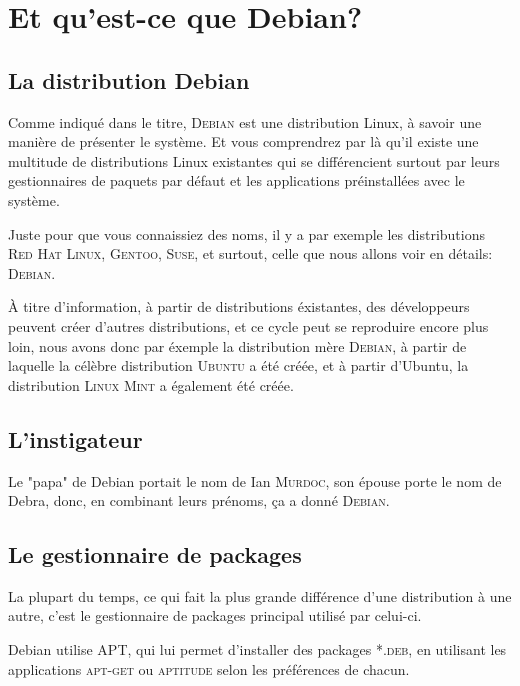 \chapter{Et qu'est-ce que Debian?}

\section{La distribution Debian}

Comme indiqué dans le titre, \textsc{Debian} est une distribution Linux, à savoir
une manière de présenter le système. Et vous comprendrez par là qu'il existe
une multitude de distributions Linux existantes qui se différencient surtout
par leurs gestionnaires de paquets par défaut et les applications préinstallées
avec le système.

Juste pour que vous connaissiez des noms, il y a par exemple les distributions
\textsc{Red Hat Linux}, \textsc{Gentoo}, \textsc{Suse}, et surtout, celle que
nous allons voir en détails: \textsc{Debian}.

À titre d'information, à partir de distributions éxistantes, des développeurs
peuvent créer d'autres distributions, et ce cycle peut se reproduire encore
plus loin, nous avons donc par éxemple la distribution mère \textsc{Debian},
à partir de laquelle la célèbre distribution \textsc{Ubuntu} a été créée, et
à partir d'Ubuntu, la distribution \textsc{Linux Mint} a également été créée.

\section{L'instigateur}

Le "papa" de Debian portait le nom de Ian \textsc{Murdoc}, son épouse porte le nom
de Debra, donc, en combinant leurs prénoms, ça a donné \textsc{Debian}.

\section{Le gestionnaire de packages}

La plupart du temps, ce qui fait la plus grande différence d'une distribution à
une autre, c'est le gestionnaire de packages principal utilisé par celui-ci.

Debian utilise \textsc{APT}, qui lui permet d'installer des packages \textsc{*.deb},
en utilisant les applications \textsc{apt-get} ou \textsc{aptitude} selon les
préférences de chacun.
